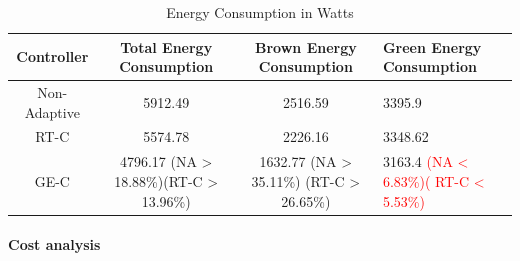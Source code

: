 


\begin{table}
\caption{Energy Consumption in Watts}
  \label{tab:watt}
\begin{tabular}{cccl}
\toprule
Controller & Total Energy Consumption & Brown Energy Consumption & Green Energy Consumption\\
\midrule
Non-Adaptive & 5912.49 & 2516.59 & 3395.9 \\
RT-C & 5574.78 & 2226.16 & 3348.62  \\  %
GE-C & 4796.17 (NA > 18.88\%)(RT-C > 13.96\%) & 1632.77 (NA > 35.11\%) (RT-C > 26.65\%) & 3163.4 \textcolor{red}{(NA < 6.83\%)( RT-C < 5.53\%)} \\
\bottomrule
\end{tabular}
\end{table}

\paragraph{\textbf{Cost analysis}}


